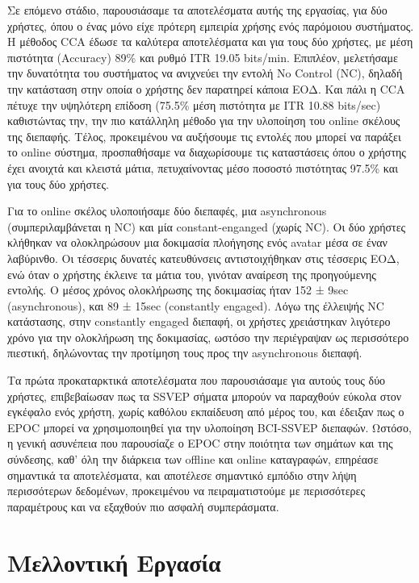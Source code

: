 \documentclass[11pt,a4paper,english,greek,twoside]{../Thesis}
\begin{document}
\par Σε επόμενο στάδιο, παρουσιάσαμε τα αποτελέσματα αυτής της εργασίας, για δύο χρήστες, όπου ο ένας μόνο είχε πρότερη εμπειρία χρήσης ενός παρόμοιου συστήματος. Η μέθοδος CCA έδωσε τα καλύτερα αποτελέσματα και για τους δύο χρήστες, με μέση πιστότητα (Accuracy) 89\% και ρυθμό ITR 19.05 bits/min. Επιπλέον, μελετήσαμε την δυνατότητα του συστήματος να ανιχνεύει την εντολή No Control (NC), δηλαδή την κατάσταση στην οποία ο χρήστης δεν παρατηρεί κάποια ΕΟΔ. Και πάλι η CCA πέτυχε την υψηλότερη επίδοση (75.5\% μέση πιστότητα με ITR 10.88 bits/sec) καθιστώντας την, την πιο κατάλληλη μέθοδο για την υλοποίηση του online σκέλους της διεπαφής. Τέλος, προκειμένου να αυξήσουμε τις εντολές που μπορεί να παράξει το online σύστημα, προσπαθήσαμε να διαχωρίσουμε τις καταστάσεις όπου ο χρήστης έχει ανοιχτά και κλειστά μάτια, πετυχαίνοντας μέσο ποσοστό πιστότητας 97.5\% και για τους δύο χρήστες.

\par Για το online σκέλος υλοποιήσαμε δύο διεπαφές, μια asynchronous (συμπεριλαμβάνεται η NC) και μία constant-enganged (χωρίς NC). Oι δύο χρήστες κλήθηκαν να ολοκληρώσουν μια δοκιμασία πλοήγησης ενός avatar μέσα σε έναν λαβύρινθο. Οι τέσσερις δυνατές κατευθύνσεις αντιστοιχήθηκαν στις τέσσερις ΕΟΔ, ενώ όταν ο χρήστης έκλεινε τα μάτια του, γινόταν αναίρεση της προηγούμενης εντολής. Ο μέσος χρόνος ολοκλήρωσης της δοκιμασίας ήταν 152 ± 9sec (asynchronous), και 89 ± 15sec (constantly engaged). Λόγω της έλλειψής NC κατάστασης, στην constantly engaged διεπαφή, οι χρήστες χρειάστηκαν λιγότερο χρόνο για την ολοκλήρωση της δοκιμασίας, ωστόσο την περιέγραψαν ως περισσότερο πιεστική, δηλώνοντας την προτίμηση τους προς την asynchronous διεπαφή.

\par Τα πρώτα προκαταρκτικά αποτελέσματα που παρουσιάσαμε για αυτούς τους δύο χρήστες, επιβεβαίωσαν πως τα SSVEP σήματα μπορούν να παραχθούν εύκολα στον εγκέφαλο ενός χρήστη, χωρίς καθόλου εκπαίδευση από μέρος του, και έδειξαν πως ο EPOC μπορεί να χρησιμοποιηθεί για την υλοποίηση BCI-SSVEP διεπαφών. Ωστόσο, η γενική ασυνέπεια που παρουσίαζε ο EPOC στην ποιότητα των σημάτων και της σύνδεσης, καθ' όλη την διάρκεια των offline και online καταγραφών, επηρέασε σημαντικά τα αποτελέσματα, και αποτέλεσε σημαντικό εμπόδιο στην λήψη περισσότερων δεδομένων, προκειμένου να πειραματιστούμε με περισσότερες παραμέτρους και να εξαχθούν πιο ασφαλή συμπεράσματα.

\section{Μελλοντική Εργασία}
\end{document}
